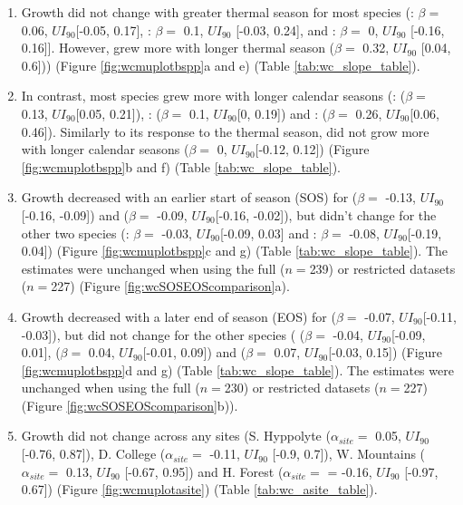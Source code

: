 \documentclass{article}\usepackage[]{graphicx}\usepackage[]{xcolor}
\begin{document}
\begin{enumerate}

\item Growth did not change with greater thermal season for most species 
(\Ainc: $\beta = $ 0.06, $UI_{90}$[-0.05, 0.17],
\Ball: $\beta = $ 
0.1, $UI_{90}$
[-0.03, 
0.24], and
\Bpop: $\beta = $ 
0, $UI_{90}$
[-0.16, 
0.16]].
However,
{\Bpap} grew more with longer thermal season ($\beta = $ 
0.32, $UI_{90}$
[0.04, 
0.6])) (Figure \ref{fig:wcmuplotbspp}a and e) (Table \ref{tab:wc_slope_table}).

\item In contrast, most species grew more with longer calendar seasons 
(\Ainc: ($\beta = $ 0.13, $UI_{90}$[0.05, 0.21]),
\Ball: ($\beta = $ 0.1, $UI_{90}$[0, 0.19]) and
\Bpap: ($\beta = $ 0.26, $UI_{90}$[0.06, 0.46]).
Similarly to its response to the thermal season,
{\Bpop} did not grow more with longer calendar seasons ($\beta = $ 0, $UI_{90}$[-0.12, 0.12])
(Figure \ref{fig:wcmuplotbspp}b and f) (Table \ref{tab:wc_slope_table}).

\item Growth decreased with an earlier start of season (SOS) for
{\Ainc} ($\beta = $ -0.13, $UI_{90}$[-0.16, -0.09]) and 
{\Bpop} ($\beta = $ -0.09, $UI_{90}$[-0.16, -0.02]), but didn't change for the other two species
(\Ball: $\beta = $ -0.03, $UI_{90}$[-0.09, 0.03] and
\Bpap: $\beta = $ -0.08, $UI_{90}$[-0.19, 0.04]) (Figure \ref{fig:wcmuplotbspp}c and g) (Table \ref{tab:wc_slope_table}). 
The estimates were unchanged when using the full ($n =$239) or restricted datasets ($n=$227) (Figure \ref{fig:wcSOSEOScomparison}a). 

\item Growth decreased with a later end of season (EOS) for 
{\Ainc} ($\beta = $ -0.07, $UI_{90}$[-0.11, -0.03]), but did not change for the other species
({\Bpop} ($\beta = $ -0.04, $UI_{90}$[-0.09, 0.01], 
{\Ball} ($\beta = $ 0.04, $UI_{90}$[-0.01, 0.09]) and
{\Bpap} ($\beta = $ 0.07, $UI_{90}$[-0.03, 0.15]) (Figure \ref{fig:wcmuplotbspp}d and g) (Table \ref{tab:wc_slope_table}). 
The estimates were unchanged when using the full ($n =$230) or restricted datasets ($n=$227) (Figure \ref{fig:wcSOSEOScomparison}b)). 

\item Growth did not change across any sites
(S. Hyppolyte ($\alpha_{site} = $ 
0.05, $UI_{90}$
[-0.76, 
0.87]),
D. College ($\alpha_{site} = $ 
-0.11, $UI_{90}$
[-0.9, 
0.7]), 
W. Mountains ($\alpha_{site} = $ 
0.13, $UI_{90}$
[-0.67, 
0.95]) and 
H. Forest ($\alpha_{site} = $ = 
-0.16, $UI_{90}$
[-0.97, 
0.67]) (Figure \ref{fig:wcmuplotasite}) (Table \ref{tab:wc_asite_table}).


\end{enumerate}
\end{document}
